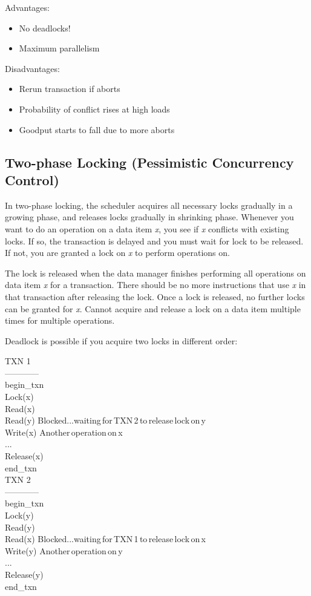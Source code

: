 \documentclass[twoside]{article}
\begin{document}
Advantages:
\begin{itemize}
\item{No deadlocks!}
\item{Maximum parallelism}
\end{itemize}

Disadvantages:
\begin{itemize}
\item{Rerun transaction if aborts}
\item{Probability of conflict rises at high loads}
\item{Goodput starts to fall due to more aborts}
\end{itemize}


\subsection{Two-phase Locking (Pessimistic Concurrency Control)}
In two-phase locking, the scheduler acquires all necessary locks gradually in a growing phase, and releases locks gradually in shrinking phase. Whenever you want to do an operation on a data item \emph{x}, you see if \emph{x} conflicts with existing locks. If so, the transaction is delayed and you must wait for lock to be released. If not, you are granted a lock on \emph{x} to perform operations on.

The lock is released when the data manager finishes performing all operations on data item \emph{x} for a transaction. There should be no more instructions that use \emph{x} in that transaction after releasing the lock. Once a lock is released, no further locks can be granted for \emph{x}. Cannot acquire and release a lock on a data item multiple times for multiple operations.

Deadlock is possible if you acquire two locks in different order:

TXN 1\\
------------\\
begin\_txn\\
Lock(x)\\
Read(x)\\
Read(y) \rightarrow Blocked...waiting\,for\,TXN\,2\,to\,release\,lock\,on\,y\\
Write(x)  \rightarrow Another\,operation\,on\,x\\
...\\
Release(x)\\
end\_txn\\


TXN 2\\
------------\\
begin\_txn\\
Lock(y)\\
Read(y)\\
Read(x) \rightarrow Blocked...waiting\,for\,TXN\,1\,to\,release\,lock\,on\,x\\
Write(y) \rightarrow Another\,operation\,on\,y\\
...\\
Release(y)\\
end\_txn\\
\end{document}
